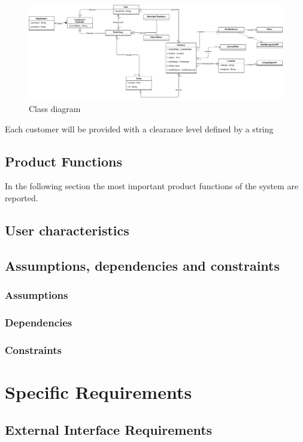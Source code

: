 \documentclass{article}
\begin{document}
\begin{figure}[H]
    \centering
    \includegraphics[scale=0.255]{Images/umlmodel}
    \caption{Class diagram}
\end{figure}

Each customer will be provided with a clearance level defined by a string 
\subsection{Product Functions}
In the following section the most important product functions of the system are reported.
\subsection{User characteristics}
\subsection{Assumptions, dependencies and constraints}
\subsubsection{Assumptions}
\subsubsection{Dependencies}
\subsubsection{Constraints}

\newpage
\section{Specific Requirements}
\subsection{External Interface Requirements}
\end{document}
